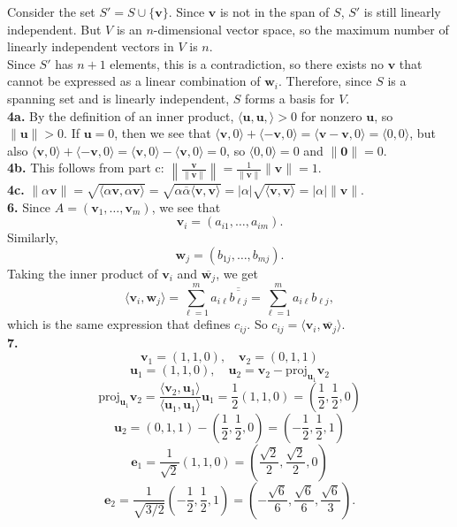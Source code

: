 \documentclass{article}
\newcommand{\bv}{\mathbf{v}}
\newcommand{\bu}{\mathbf{u}}
\newcommand{\bw}{\mathbf{w}}
\newcommand{\be}{\mathbf{e}}
\newcommand{\bO}{\mathbf{0}}
\newcommand{\la}{\langle}
\newcommand{\ra}{\rangle}
\begin{document}
Consider the set $S' = S \cup \{\bv\}$. Since $\bv$ is not in the span of $S$, $S'$ is still linearly independent. But $V$ is an $n$-dimensional vector space, so the maximum number of linearly independent vectors in $V$ is $n$. \\

Since $S'$ has $n + 1$ elements, this is a contradiction, so there exists no $\bv$ that cannot be expressed as a linear combination of $\bw_i$. Therefore, since $S$ is a spanning set and is linearly independent, $S$ forms a basis for $V$. \\

\textbf{4a.} By the definition of an inner product, $\la \bu, \bu, \ra > 0$ for nonzero $\bu$, so $\|\bu\| > 0$. If $\bu = 0$, then we see that $\la \bv, 0 \ra + \la -\bv, 0 \ra = \la \bv - \bv, 0 \ra = \la 0, 0 \ra$, but also $\la \bv, 0 \ra + \la -\bv, 0 \ra = \la \bv, 0 \ra - \la \bv, 0 \ra = 0$, so $\la 0, 0 \ra = 0$ and $\|\bO\| = 0$. \\

\textbf{4b.} This follows from part c: $\left\|\frac{\bv}{\|\bv\|}\right\| = \frac{1}{\|\bv\|}\|\bv\| = 1$. \\

\textbf{4c.} $\|\alpha\bv\| = \sqrt{\la \alpha \bv, \alpha \bv \ra} = \sqrt{\alpha \overline{\alpha} \la \bv, \bv \ra} = |\alpha| \sqrt{\la \bv, \bv \ra} = |\alpha| \|\bv\|$. \\

\textbf{6.} Since $A = (\bv_1, \ldots, \bv_m)$, we see that
$$\bv_i = (a_{i1}, \ldots, a_{im}).$$
Similarly,
$$\bw_j = (b_{1j}, \ldots, b_{mj}).$$
Taking the inner product of $\bv_i$ and $\overline{\bw_j}$, we get
$$\la \bv_i, \bw_j \ra = \sum_{\ell = 1}^m a_{i\ell}\overline{\overline{b_{\ell j}}} = \sum_{\ell = 1}^m a_{i\ell}b_{\ell j},$$
which is the same expression that defines $c_{ij}$. So $c_{ij} = \la \bv_i, \overline{\bw_j} \ra$. \\

\textbf{7.}
$$\bv_1 = (1, 1, 0), \quad \bv_2 = (0, 1, 1)$$
$$\bu_1 = (1, 1, 0), \quad \bu_2 = \bv_2 - \text{proj}_{\bu_1}\bv_2$$
$$\text{proj}_{\bu_1}\bv_2 = \frac{\la \bv_2, \bu_1 \ra}{\la \bu_1, \bu_1 \ra}\bu_1 = \frac{1}{2}(1, 1, 0) = \left(\frac{1}{2}, \frac{1}{2}, 0\right)$$
$$\bu_2 = (0, 1, 1) - \left(\frac{1}{2}, \frac{1}{2}, 0\right) = \left(-\frac{1}{2}, \frac{1}{2}, 1\right)$$
$$\be_1 = \frac{1}{\sqrt{2}}(1, 1, 0) = \left(\frac{\sqrt{2}}{2}, \frac{\sqrt{2}}{2}, 0\right)$$
$$\be_2 = \frac{1}{\sqrt{3/2}}\left(-\frac{1}{2}, \frac{1}{2}, 1\right) = \left(-\frac{\sqrt{6}}{6}, \frac{\sqrt{6}}{6}, \frac{\sqrt{6}}{3}\right).$$
\end{document}
